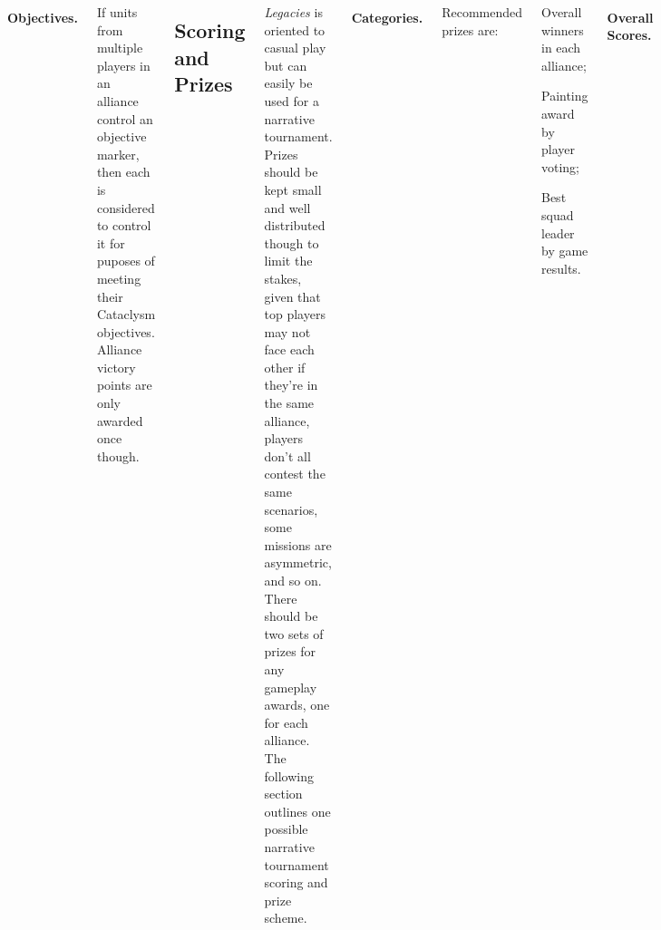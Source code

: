 \begin{columns}
\paragraph{Objectives.} If units from multiple players in an alliance
control an objective marker, then each is considered to control it for
puposes of meeting their Cataclysm objectives.  Alliance victory
points are only awarded once though.


\subsection{Scoring and Prizes}

\emph{Legacies} is oriented to casual play but can easily be used for
a narrative tournament.  Prizes should be kept small and well
distributed though to limit the stakes, given that top players may not
face each other if they're in the same alliance, players don't all
contest the same scenarios, some missions are asymmetric, and so on.
There should be two sets of prizes for any gameplay awards, one for
each alliance.  The following section outlines one possible narrative
tournament scoring and prize scheme.

\paragraph{Categories.}
Recommended prizes are:

\begin{squishitemize}
\item Overall winners in each alliance;
\item Painting award by player voting;
\item Best squad leader by game results.
\end{squishitemize}

\paragraph{Overall Scores.} A total of~100 points are available
throughout the campaign:

\begin{squishitemize}
\item 60 points for game results;
\item 20 points for painting and craftwork;
\item 20 points for sportsmanship.
\end{squishitemize}


\end{columns}
